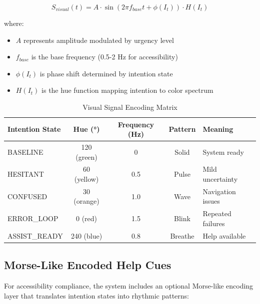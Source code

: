 \documentclass[11pt,a4paper]{article}
\begin{document}
\begin{equation}
S_{visual}(t) = A \cdot \sin(2\pi f_{base} t + \phi(I_t)) \cdot H(I_t)
\end{equation}

where:
\begin{itemize}
    \item $A$ represents amplitude modulated by urgency level
    \item $f_{base}$ is the base frequency (0.5-2 Hz for accessibility)
    \item $\phi(I_t)$ is phase shift determined by intention state
    \item $H(I_t)$ is the hue function mapping intention to color spectrum
\end{itemize}

\begin{table}[H]
\centering
\begin{tabular}{|l|c|c|c|l|}
\hline
\textbf{Intention State} & \textbf{Hue (°)} & \textbf{Frequency (Hz)} & \textbf{Pattern} & \textbf{Meaning} \\
\hline
BASELINE & 120 (green) & 0 & Solid & System ready \\
HESITANT & 60 (yellow) & 0.5 & Pulse & Mild uncertainty \\
CONFUSED & 30 (orange) & 1.0 & Wave & Navigation issues \\
ERROR\_LOOP & 0 (red) & 1.5 & Blink & Repeated failures \\
ASSIST\_READY & 240 (blue) & 0.8 & Breathe & Help available \\
\hline
\end{tabular}
\caption{Visual Signal Encoding Matrix}
\label{tab:visual_signals}
\end{table}

\subsection{Morse-Like Encoded Help Cues}

For accessibility compliance, the system includes an optional Morse-like encoding layer that translates intention states into rhythmic patterns:
\end{document}

